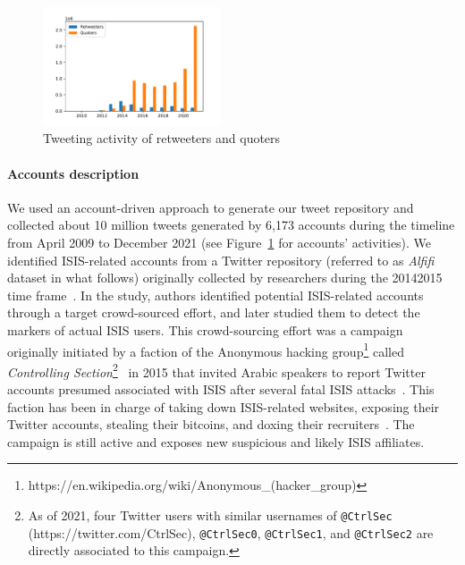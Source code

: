 \documentclass[letterpaper]{article}
\begin{document}
\begin{figure}[ht]
\includegraphics[width=0.47\textwidth]{img/overall-activity.pdf}
\caption{Tweeting activity of retweeters and quoters}
\label{fig:tweeting-activity}
\end{figure}


\paragraph{Accounts description} We used an account-driven approach to generate our tweet repository and  collected about 10 million tweets generated  by 6,173 accounts during the timeline from April 2009 to December 2021 (see Figure~\ref{fig:tweeting-activity} for accounts' activities).
We identified ISIS-related accounts  from a Twitter repository (referred to as \textit{Alfifi} dataset in what follows) originally collected by researchers during the 20142015 time frame~\cite{alfifi2018measuring}. In the study, authors   identified  potential ISIS-related accounts through a target crowd-sourced effort, and later studied them to detect  the markers of actual ISIS users. This crowd-sourcing effort was a campaign originally initiated by a faction of the Anonymous hacking group\footnote{https://en.wikipedia.org/wiki/Anonymous\_(hacker\_group)} called \textit{Controlling Section}\footnote{As of 2021, four Twitter users with similar usernames of \texttt{@CtrlSec} (https://twitter.com/CtrlSec), \texttt{@CtrlSec0}, \texttt{@CtrlSec1}, and \texttt{@CtrlSec2} are directly associated to this campaign.}~\cite{ctrl-sec} in 2015 that invited Arabic speakers to report Twitter accounts presumed associated  with  ISIS after several fatal ISIS attacks~\cite{anon-hacktivist}. This faction has been in charge of taking down ISIS-related websites, exposing their Twitter accounts, stealing their bitcoins, and doxing their recruiters~\cite{ctrl-sec}. The campaign is still active and exposes new suspicious and likely ISIS affiliates.
\end{document}
